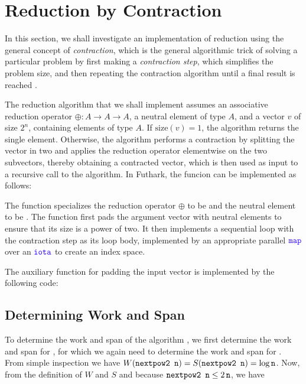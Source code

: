 \documentclass[oneside,11pt]{book}
\begin{document}
\section{Reduction by Contraction}

In this section, we shall investigate an implementation of reduction
using the general concept of \emph{contraction}, which is the general
algorithmic trick of solving a particular problem by first making a
\emph{contraction step}, which simplifies the problem size, and then
repeating the contraction algorithm until a final result is reached
\cite{algdesign:parseq2016}.

The reduction algorithm that we shall implement assumes an associative
reduction operator $\oplus : A \rightarrow A \rightarrow A$, a neutral
element of type $A$, and a vector $v$ of size $2^n$, containing
elements of type $A$. If $\mathrm{size}(v) = 1$, the algorithm returns
the single element. Otherwise, the algorithm performs a contraction by
splitting the vector in two and applies the reduction operator
elementwise on the two subvectors, thereby obtaining a contracted
vector, which is then used as input to a recursive call to the
algorithm. In Futhark, the funcion  can be implemented as
follows:



\noindent
The function specializes the reduction operator $\oplus$ to be \kw{+}
and the neutral element to be . The function first pads the
argument vector  with neutral elements to ensure that its size
is a power of two. It then implements a sequential loop with the
contraction step as its loop body, implemented by an appropriate
parallel $\fop{map}$ over an $\fop{iota}$ to create an index space.

The auxiliary function for padding the input vector is implemented by the following code:



\subsection{Determining Work and Span}

To determine the work and span of the algorithm , we first
determine the work and span for , for which we again need
to determine the work and span for . From simple
inspection we have $W(\texttt{nextpow2 n}) = S(\texttt{nextpow2 n}) =
\mathrm{log}\,\texttt{n}$. Now, from the definition of $W$ and $S$ and
because $\texttt{nextpow2 n} \leq 2\,\texttt{n}$, we have
\end{document}
